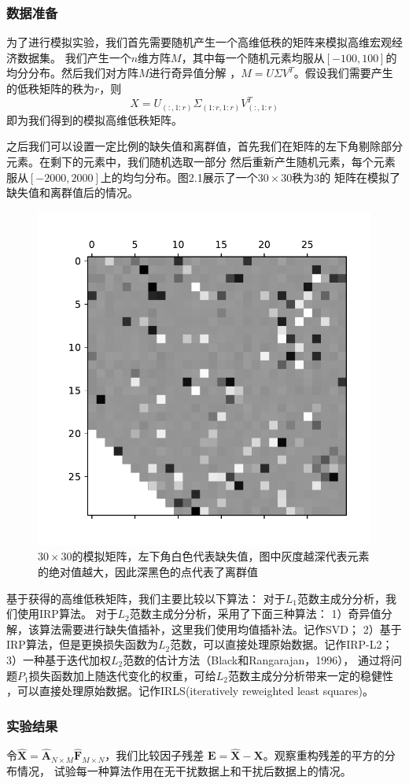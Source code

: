 \subsubsection{数据准备}
为了进行模拟实验，我们首先需要随机产生一个高维低秩的矩阵来模拟高维宏观经济数据集。
我们产生一个$n$维方阵$M$，其中每一个随机元素均服从$[-100, 100]$的均分分布。然后我们对方阵$M$进行奇异值分解
，$M = U\Sigma V^{T}$。假设我们需要产生的低秩矩阵的秩为$r$，则$$X = U_{(:,1:r)}\Sigma_{(1:r,1:r)}V^T_{(:,1:r)}$$
即为我们得到的模拟高维低秩矩阵。

之后我们可以设置一定比例的缺失值和离群值，首先我们在矩阵的左下角剔除部分元素。在剩下的元素中，我们随机选取一部分
然后重新产生随机元素，每个元素服从$[-2000,2000]$上的均匀分布。图2.1展示了一个$30\times30$秩为3的
矩阵在模拟了缺失值和离群值后的情况。

\begin{figure}[H]
    \centering
    \includegraphics[width=.5\textwidth]{pics/chapter2/matrix.pdf}
    \caption{\small $30\times30$的模拟矩阵，左下角白色代表缺失值，图中灰度越深代表元素的绝对值越大，因此深黑色的点代表了离群值}
    \label{fig2.1}
\end{figure}

基于获得的高维低秩矩阵，我们主要比较以下算法：
对于$L_1$范数主成分分析，我们使用IRP算法。
对于$L_2$范数主成分分析，采用了下面三种算法：
1）奇异值分解，该算法需要进行缺失值插补，这里我们使用均值插补法。记作SVD；
2）基于IRP算法，但是更换损失函数为$L_2$范数，可以直接处理原始数据。记作IRP-L2；
3）一种基于迭代加权$L_2$范数的估计方法（Black和Rangarajan，1996），
通过将问题$P_1$损失函数加上随迭代变化的权重，可给$L_2$范数主成分分析带来一定的稳健性
，可以直接处理原始数据。记作IRLS(iteratively reweighted least squares)。

\subsubsection{实验结果}
令$\hat{\bm{X}} = \hat{\bm{A}}_{N \times M}\hat{\bm{F}}_{M \times N}$，我们比较因子残差
$\bm{E} = \hat{\bm{X}} -\bm{X}$。观察重构残差的平方的分布情况，
试验每一种算法作用在无干扰数据上和干扰后数据上的情况。

